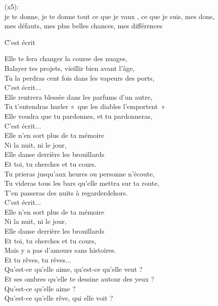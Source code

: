 \documentclass{novel}
\begin{document}
\begin{bfseries}
[Refrain] (x5):\\
je te donne, je te donne tout ce que je vaux , ce que je suis, mes dons, \\
mes défauts, mes plus belles chances, mes différences
\end{bfseries}

\newpage
\normalsize

\h*{C’est écrit}

\begin{multicols}{2}
Elle te fera changer la course des nuages, \\
Balayer tes projets, vieillir bien avant l'âge, \\
Tu la perdras cent fois dans les vapeurs des ports, \\
C'est écrit... \\
Elle rentrera blessée dans les parfums d'un autre, \\
Tu t'entendras hurler «~que les diables l'emportent~» \\
Elle voudra que tu pardonnes, et tu pardonneras, \\
C'est écrit... \\
Elle n'en sort plus de ta mémoire \\
Ni la nuit, ni le jour, \\
Elle danse derrière les brouillards \\
Et toi, tu cherches et tu cours. \\
Tu prieras jusqu'aux heures ou personne n'écoute, \\
Tu videras tous les bars qu'elle mettra sur ta route, \\
T'en passeras des nuits à regarderdehors. \\
C'est écrit... \\
Elle n'en sort plus de ta mémoire \\
Ni la nuit, ni le jour, \\
Elle danse derrière les brouillards \\
Et toi, tu cherches et tu cours, \\
Mais y a pas d'amours sans histoires. \\
Et tu rêves, tu rêves... \\
Qu'est-ce qu'elle aime, qu'est-ce qu'elle veut ? \\
Et ses ombres qu'elle te dessine autour des yeux ? \\
Qu'est-ce qu'elle aime ? \\
Qu'est-ce qu'elle rêve, qui elle voit ? \\

\end{multicols}
\end{document}
